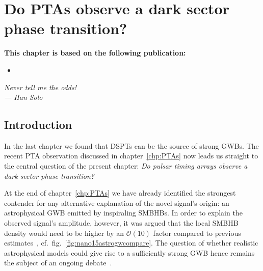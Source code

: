 \chapter{Do PTAs observe a dark sector phase transition?} \label{chp:ptabbn}

\begin{tcolorbox}[colframe=DESYcyan, colback=DESYcyan!10]
	\textbf{This chapter is based on the following publication:}
	\begin{itemize}[leftmargin=17pt]
		\item[\cite{Bringmann:2023opz}] 
	\end{itemize}
\end{tcolorbox}
\vspace{0.5cm}

\begin{flushright}
	\slshape
	Never tell me the odds!\\ \medskip
	--- Han Solo
\end{flushright}

\section{Introduction}


In the last chapter we found that \acp{DSPT} can be the source of strong \acp{GWB}. The recent \ac{PTA} observation discussed in chapter~\ref{chp:PTAs} now leads us straight to the central question of the present chapter: \textit{Do pulsar timing arrays observe a dark sector phase transition?}

At the end of chapter~\ref{chp:PTAs} we have already identified the strongest contender for any alternative explanation of the novel signal's origin: an astrophysical \ac{GWB} emitted by inspiraling \acp{SMBHB}. In order to explain the observed signal's amplitude, however, it  was argued that the local \ac{SMBHB} density would need to be higher by an $\mathcal{O}(10)$ factor compared to previous estimates~\cite{Casey-Clyde:2021xro, Kelley:2016gse, Kelley:2017lek}, cf.~fig.~\ref{fig:nano15astrogwcompare}. The question of whether realistic astrophysical models could give rise to a sufficiently strong \ac{GWB} hence remains the subject of an ongoing debate~\cite{Middleton:2020asl, Izquierdo-Villalba:2021prf, Curylo:2021pvf, Somalwar:2023bqv, NANOGrav:2023hfp}.

